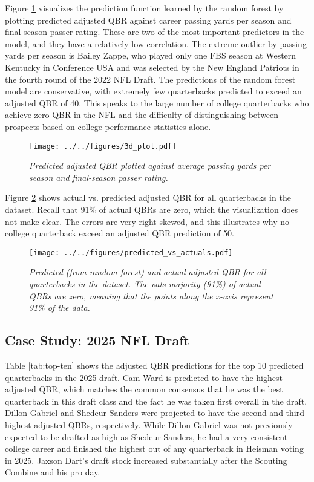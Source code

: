 \documentclass[Review, sageh, times]{sagej}
\begin{document}
Figure \ref{fig:3d-plot} visualizes the prediction function learned by the random forest by plotting predicted adjusted QBR against career passing yards per season and final-season passer rating. These are two of the most important predictors in the model, and they have a relatively low correlation. The extreme outlier by passing yards per season is Bailey Zappe, who played only one FBS season at Western Kentucky in Conference USA and was selected by the New England Patriots in the fourth round of the 2022 NFL Draft. The predictions of the random forest model are conservative, with extremely few quarterbacks predicted to exceed an adjusted QBR of 40. This speaks to the large number of college quarterbacks who achieve zero QBR in the NFL and the difficulty of distinguishing between prospects based on college performance statistics alone.

\begin{figure}[H]
    \centering
    \texttt{[image: ../../figures/3d\_plot.pdf]}
    \caption{\textit{Predicted adjusted QBR plotted against average passing yards per season and final-season passer rating.}}
    \label{fig:3d-plot}
\end{figure}

Figure \ref{fig:predicted-vs-actuals} shows actual vs. predicted adjusted QBR for all quarterbacks in the dataset. Recall that 91\% of actual QBRs are zero, which the visualization does not make clear. The errors are very right-skewed, and this illustrates why no college quarterback exceed an adjusted QBR prediction of 50.

\begin{figure}[H]
  \centering
  \texttt{[image: ../../figures/predicted\_vs\_actuals.pdf]}
  \caption{\textit{Predicted (from random forest) and actual adjusted QBR for all quarterbacks in the dataset. The vats majority (91\%) of actual QBRs are zero, meaning that the points along the x-axis represent 91\% of the data.}}
  \label{fig:predicted-vs-actuals}
\end{figure}

\subsection{Case Study: 2025 NFL Draft}
Table \ref{tab:top-ten} shows the adjusted QBR predictions for the top 10 predicted quarterbacks in the 2025 draft. Cam Ward is predicted to have the highest adjusted QBR, which matches the common consensus that he was the best quarterback in this draft class and the fact he was taken first overall in the draft. Dillon Gabriel and Shedeur Sanders were projected to have the second and third highest adjusted QBRs, respectively. While Dillon Gabriel was not previously expected to be drafted as high as Shedeur Sanders, he had a very consistent college career and finished the highest out of any quarterback in Heisman voting in 2025. Jaxson Dart's draft stock increased substantially after the Scouting Combine and his pro day.
\end{document}
